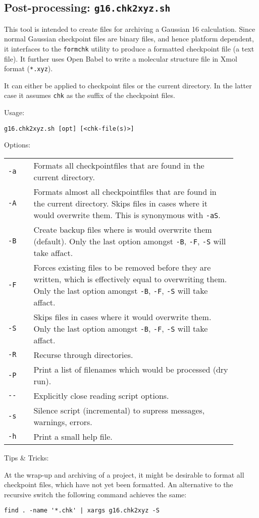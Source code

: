 \documentclass[   %
  final,          %
  a4paper         %
]{article}
\begin{document}
\subsection{Post-processing: \texorpdfstring{{\lstinline`g16.chk2xyz.sh`}}{g16.chk2xyz.sh}}
\label{sec:g16.chk2xyz}

This tool is intended to create files for archiving a Gaussian 16 calculation.
Since normal Gaussian checkpoint files are binary files, and hence platform dependent,
it interfaces to the \texttt{formchk} utility to produce a formatted checkpoint file (a text file).
It further uses Open Babel to write a molecular structure file in Xmol format (\texttt{*.xyz}).

It can either be applied to checkpoint files or the current directory.
In the latter case it assumes \texttt{chk} as the suffix of the checkpoint files.

Usage: 

\lstinline`g16.chk2xyz.sh [opt] [<chk-file(s)>]`

Options:

\begin{tabular}{p{0.1\linewidth}p{0.8\linewidth}}
  {\lstinline`-a`}       & Formats all checkpointfiles that are found in the current directory. \\
  {\lstinline`-A`}       & Formats almost all checkpointfiles that are found in the current directory. 
    Skips files in cases where it would overwrite them.
    This is synonymous with \lstinline`-aS`.\\
  {\lstinline`-B`}       & Create backup files where is would overwrite them (default). 
    Only the last option amongst \lstinline`-B`, \lstinline`-F`, \lstinline`-S` will take affact.\\
  {\lstinline`-F`}       & Forces existing files to be removed before they are written, 
    which is effectively equal to overwriting them.
    Only the last option amongst \lstinline`-B`, \lstinline`-F`, \lstinline`-S` will take affact.\\
  {\lstinline`-S`}       & Skips files in cases where it would overwrite them.
    Only the last option amongst \lstinline`-B`, \lstinline`-F`, \lstinline`-S` will take affact.\\
  {\lstinline`-R`}       & Recurse through directories.\\
  {\lstinline`-P`}       & Print a list of filenames which would be processed (dry run).\\
  {\lstinline`--`}       & Explicitly close reading script options. \\
  {\lstinline`-s`}       & Silence script (incremental) to supress messages, warnings, errors. \\
  {\lstinline`-h`}       & Print a small help file. \\
\end{tabular}

Tips \& Tricks:

At the wrap-up and archiving of a project, it might be desirable to format all checkpoint files,
which have not yet been formatted. 
An alternative to the recursive switch the following command achieves the same:

\lstinline`find . -name '*.chk' | xargs g16.chk2xyz -S`
\end{document}
